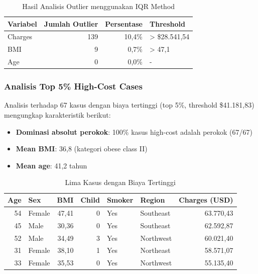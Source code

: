 \begin{table}[H]
\centering
\caption{Hasil Analisis Outlier menggunakan IQR Method}
\label{tab:outlier-analysis}
\begin{tabular}{|l|r|r|l|}
\hline
\textbf{Variabel} & \textbf{Jumlah Outlier} & \textbf{Persentase} & \textbf{Threshold} \\
\hline
Charges & 139 & 10,4\% & > \$28.541,54 \\
BMI & 9 & 0,7\% & > 47,1 \\
Age & 0 & 0,0\% & - \\
\hline
\end{tabular}
\end{table}

\subsubsection{Analisis Top 5\% High-Cost Cases}

Analisis terhadap 67 kasus dengan biaya tertinggi (top 5\%, threshold \$41.181,83) mengungkap karakteristik berikut:

\begin{itemize}
    \item \textbf{Dominasi absolut perokok}: 100\% kasus high-cost adalah perokok (67/67)
    \item \textbf{Mean BMI}: 36,8 (kategori obese class II)
    \item \textbf{Mean age}: 41,2 tahun
\end{itemize}

\begin{table}[H]
\centering
\caption{Lima Kasus dengan Biaya Tertinggi}
\label{tab:top-5-charges}
\begin{tabular}{|r|l|r|r|l|l|r|}
\hline
\textbf{Age} & \textbf{Sex} & \textbf{BMI} & \textbf{Child} & \textbf{Smoker} & \textbf{Region} & \textbf{Charges (USD)} \\
\hline
54 & Female & 47,41 & 0 & Yes & Southeast & 63.770,43 \\
45 & Male & 30,36 & 0 & Yes & Southeast & 62.592,87 \\
52 & Male & 34,49 & 3 & Yes & Northwest & 60.021,40 \\
31 & Female & 38,10 & 1 & Yes & Northeast & 58.571,07 \\
33 & Female & 35,53 & 0 & Yes & Northwest & 55.135,40 \\
\hline
\end{tabular}
\end{table}

